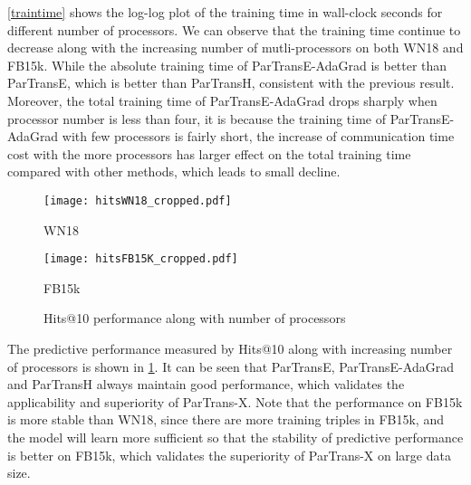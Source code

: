 \documentclass[sigconf]{acmart}
\begin{document}
\figurename \ref{traintime}  shows the log-log plot of the training time in wall-clock seconds for different number of processors. We can observe that the training time continue to decrease along with the increasing number of mutli-processors on both WN18 and FB15k. While the absolute training time of ParTransE-AdaGrad is better than ParTransE, which is better than ParTransH, consistent with the previous result. Moreover, the total training time of ParTransE-AdaGrad drops sharply when processor number is less than four, it is because the training time of ParTransE-AdaGrad with few processors is fairly short, the increase of communication time cost  with the more processors has larger effect on the total training time compared with other methods,  which leads to small decline. 



\begin{figure}[htbp]
\begin{minipage}[t]{0.45\linewidth}
\centering
\texttt{[image: hitsWN18\_cropped.pdf]}
\vspace{-15pt}
\caption*{WN18}
\end{minipage}
\begin{minipage}[t]{0.45\linewidth}
\centering
\texttt{[image: hitsFB15K\_cropped.pdf]}
\vspace{-15pt}
\caption*{FB15k}
\end{minipage}
\vspace{-7pt}
\caption{Hits@10 performance along with number of processors}
\label{performance}
\vspace{-10pt}
\end{figure}




 The predictive performance measured by Hits@10 along with increasing number of processors is shown in \figurename \ref{performance}. It can be seen that ParTransE, ParTransE-AdaGrad and ParTransH always maintain good performance, which  validates the applicability  and superiority of  ParTrans-X. Note that the performance on FB15k is more stable than WN18, since there are more training triples in FB15k, and the model will learn more sufficient so that the stability of predictive performance is better on FB15k, which validates the superiority of ParTrans-X on large data size.
\end{document}
